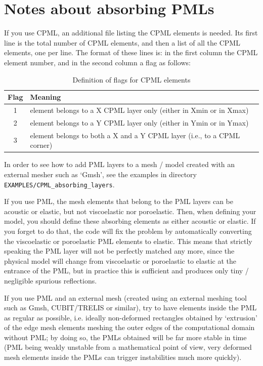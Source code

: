 \section{Notes about absorbing PMLs}
If you use CPML, an additional file listing the CPML elements is needed.
Its first line is the total number of
CPML elements, and then a list of all the CPML elements, one per line.
The format of these lines is: in the first column the CPML element number, and in the second column a flag as follows:

\begin{table}[hb]
\caption{Definition of flags for CPML elements}
\centering
\begin{tabular}{c l}
\hline\hline
Flag& Meaning\\ [0.5ex]
\hline
1 & element belongs to a X CPML layer only (either in Xmin or in Xmax)\\
2 & element belongs to a Y CPML layer only (either in Ymin or in Ymax)\\
3 & element belongs to both a X and a Y CPML layer (i.e., to a CPML corner)\\ [1ex]
\hline
\end{tabular}
\label{table:CPMLflags}
\end{table}

In order to see how to add PML layers to a mesh / model created with an external mesher such as `Gmsh', see the examples in directory
\texttt{EXAMPLES/CPML\_absorbing\_layers}.

If you use PML, the mesh elements that belong to the PML layers can be acoustic or elastic, but not viscoelastic nor poroelastic.
Then, when defining your model, you should define these absorbing elements as either acoustic or elastic.
If you forget to do that, the code will fix the problem by automatically converting the viscoelastic or poroelastic PML
elements to elastic. This means that strictly speaking the PML layer will not be perfectly matched any more, since the physical
model will change from viscoelastic or poroelastic to elastic at the entrance of the PML, but in practice this is sufficient and
produces only tiny / negligible spurious reflections.

If you use PML and an external mesh (created using an external meshing tool
such as Gmsh, CUBIT/TRELIS or similar), try to have elements inside the PML as regular as possible,
i.e. ideally non-deformed rectangles obtained by `extrusion' of the edge mesh elements meshing the
outer edges of the computational domain without PML; by doing so, the PMLs obtained will be far more stable
in time (PML being weakly unstable from a mathematical point of view, very deformed mesh elements
inside the PMLs can trigger instabilities much more quickly).

